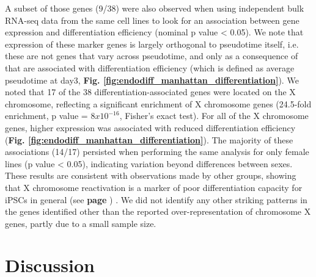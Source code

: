 A subset of those genes (9/38) were also observed when using independent bulk RNA-seq data from the same cell lines to look for an association between gene expression and differentiation efficiency (nominal p value < 0.05). 
We note that expression of these marker genes is largely orthogonal to pseudotime itself, i.e. these are not genes that vary across pseudotime, and only as a consequence of that are associated with differentiation efficiency (which is defined as average pseudotime at day3, \textbf{Fig. \ref{fig:endodiff_manhattan_differentiation}}). 
We noted that 17 of the 38 differentiation-associated genes were located on the X chromosome, reflecting a significant enrichment of X chromosome genes (24.5-fold enrichment, p value = $8x10^{-16}$, Fisher’s exact test). 
For all of the X chromosome genes, higher expression was associated with reduced differentiation efficiency (\textbf{Fig. \ref{fig:endodiff_manhattan_differentiation}}). 
The majority of these associations (14/17) persisted when performing the same analysis for only female lines (p value < 0.05), indicating variation beyond differences between sexes. 
\\


These results are consistent with observations made by other groups, showing that X chromosome reactivation is a marker of poor differentiation capacity for iPSCs in general (see \textbf{page \pageref{sec:ipsc_somatic_cell}}) \cite{anguera2012molecular, patel2017human}. 
We did not identify any other striking patterns in the genes identified other than the reported over-representation of chromosome X genes, partly due to a small sample size.


\section{Discussion}

